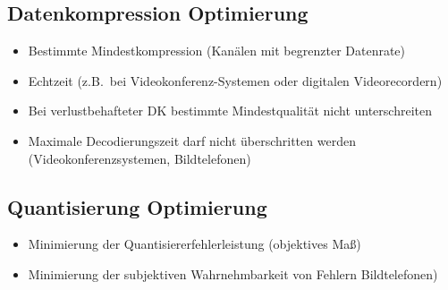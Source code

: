 

\subsection*{Datenkompression Optimierung}
\begin{itemize}
    \setlength{\parskip}{0pt}
    \setlength{\itemsep}{0pt plus 1pt}
    \item Bestimmte Mindestkompression (Kanälen mit begrenzter Datenrate)
    \item Echtzeit (z.B.\ bei Videokonferenz-Systemen oder digitalen Videorecordern)
    \item Bei verlustbehafteter DK bestimmte Mindestqualität nicht unterschreiten
    \item Maximale Decodierungszeit darf nicht überschritten werden (Videokonferenzsystemen, Bildtelefonen)
\end{itemize}

\subsection*{Quantisierung Optimierung}
\begin{itemize}
    \setlength{\parskip}{0pt}
    \setlength{\itemsep}{0pt plus 1pt}
    \item Minimierung der Quantisiererfehlerleistung (objektives Maß)
    \item Minimierung der subjektiven Wahrnehmbarkeit von Fehlern Bildtelefonen)
\end{itemize}






